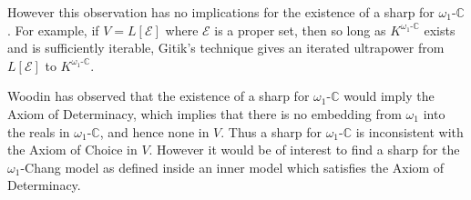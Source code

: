 \documentclass[
twoside,
]{article}
\theoremstyle{definition}
\theoremstyle{remark}
\newcommand\chang{\mathbb{C}}
\begin{document}
However this observation has no implications for the existence of a
sharp for $\omega_1$-$\chang$.    For example, if $V=L[\mathcal{E}]$
where $\mathcal{E}$ is a proper set, then so long as
$K^{\omega_1\text{-}\chang}$ exists and is sufficiently iterable, Gitik's
technique gives an iterated ultrapower from $L[\mathcal{E}]$ to $K^{\omega_1\text{-}\chang}$.

Woodin has observed that the existence of a sharp for
$\omega_1$-$\chang$ would imply  the Axiom of Determinacy, which
 implies that there is no embedding from $\omega_1$ into
the reals in $\omega_1$-$\chang$, and hence none in $V$.   Thus a
sharp for $\omega_1$-$\chang$ is inconsistent with the Axiom of
Choice in $V$.
However it would be of interest to find a sharp for the
$\omega_1$-Chang model as defined inside an inner model which satisfies the
Axiom of Determinacy.


\todos
\end{document}
